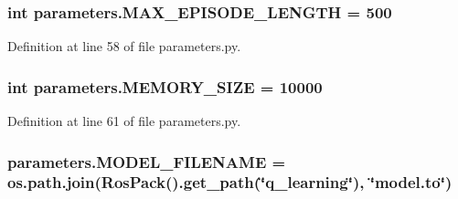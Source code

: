 \subsubsection[{\texorpdfstring{M\+A\+X\+\_\+\+E\+P\+I\+S\+O\+D\+E\+\_\+\+L\+E\+N\+G\+TH}{MAX_EPISODE_LENGTH}}]{\setlength{\rightskip}{0pt plus 5cm}int parameters.\+M\+A\+X\+\_\+\+E\+P\+I\+S\+O\+D\+E\+\_\+\+L\+E\+N\+G\+TH = 500}\hypertarget{namespaceparameters_aa473cc3b100416af3310c6c5a6d19570}{}\label{namespaceparameters_aa473cc3b100416af3310c6c5a6d19570}


Definition at line 58 of file parameters.\+py.

\subsubsection[{\texorpdfstring{M\+E\+M\+O\+R\+Y\+\_\+\+S\+I\+ZE}{MEMORY_SIZE}}]{\setlength{\rightskip}{0pt plus 5cm}int parameters.\+M\+E\+M\+O\+R\+Y\+\_\+\+S\+I\+ZE = 10000}\hypertarget{namespaceparameters_a49f1ad074b5710a98fc783c5627ddade}{}\label{namespaceparameters_a49f1ad074b5710a98fc783c5627ddade}


Definition at line 61 of file parameters.\+py.

\subsubsection[{\texorpdfstring{M\+O\+D\+E\+L\+\_\+\+F\+I\+L\+E\+N\+A\+ME}{MODEL_FILENAME}}]{\setlength{\rightskip}{0pt plus 5cm}parameters.\+M\+O\+D\+E\+L\+\_\+\+F\+I\+L\+E\+N\+A\+ME = os.\+path.\+join(Ros\+Pack().get\+\_\+path(\char`\"{}q\+\_\+learning\char`\"{}), \char`\"{}model.\+to\char`\"{})}\hypertarget{namespaceparameters_aff8b0668384f3fa2d1212d3bd0ff42fa}{}\label{namespaceparameters_aff8b0668384f3fa2d1212d3bd0ff42fa}


